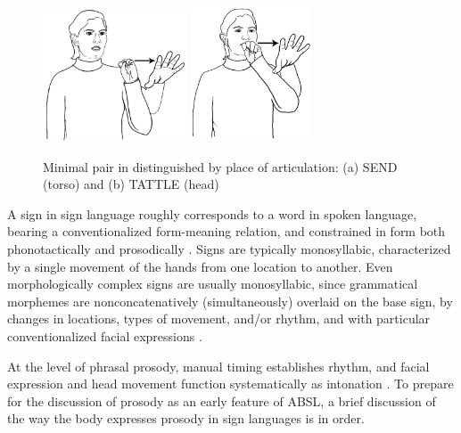 \documentclass[output=paper]{langsci/langscibook}
\begin{document}
\begin{figure}
{\includegraphics[width=0.38\textwidth]{figures/1a__SEND_copy.jpg}}
{\includegraphics[width=0.32\textwidth]{figures/1b__TATTLE.jpg}}
\caption{Minimal pair in  distinguished by place of articulation:  (a) SEND (torso) and (b) TATTLE (head)}
\label{fig:sandler:1}
\end{figure}


A sign in sign language roughly corresponds to a word in spoken language, bearing a conventionalized form-meaning relation, and constrained in form both phonotactically \citep{Battison1978,Mandel1981} and prosodically \citep{Sandler1999}.  Signs are typically monosyllabic, characterized by a single movement of the hands from one location to another. Even morphologically complex signs are usually monosyllabic, since grammatical morphemes are nonconcatenatively (simultaneously) overlaid on the base sign, by changes in locations, types of movement, and/or rhythm, and with particular conventionalized facial expressions \citep{Sandler1999}. %

At the level of phrasal prosody, manual timing establishes rhythm, and facial expression and head movement function systematically as intonation \citep{Nespor1998,Dachkovsky2013}.  To prepare for the discussion of prosody as an early feature of ABSL, a brief discussion of the way the body expresses prosody in sign languages is in order.  
\end{document}
